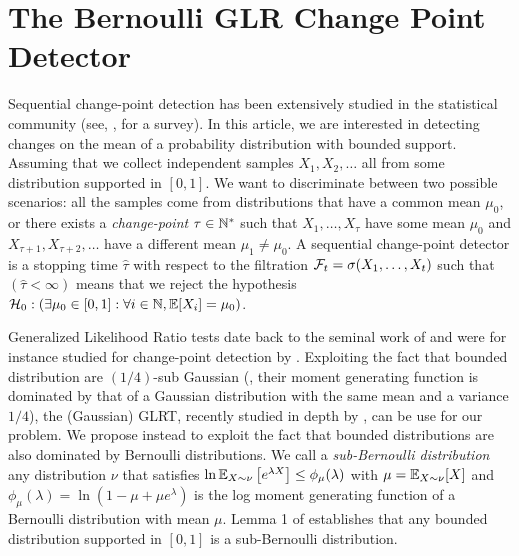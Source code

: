 

\section{The Bernoulli GLR Change Point Detector}
\label{sec:6:ChangePointDetector}

Sequential change-point detection has been extensively studied in the statistical community (see, \eg, \cite{Basseville93} for a survey). In this article, we are interested in detecting changes on the mean of a probability distribution with bounded support. Assuming that  we collect independent samples $X_1,X_2,\ldots$ all from some distribution supported in $[0,1]$. We want to discriminate between two possible scenarios: all the samples come from distributions that have a common mean $\mu_0$, or there exists a \emph{change-point} $\tau \in\mathbb{N}^*$ such that $X_1,\ldots,X_\tau$ have some mean $\mu_0$ and $X_{\tau +1},X_{\tau+2},\ldots$ have a different mean $\mu_1 \neq \mu_0$.
%
A sequential change-point detector is a stopping time $\hat\tau$ with respect to the filtration $\mathcal{F}_t = \sigma(X_1,\dots,X_t)$ such that $(\hat \tau < \infty)$ means that we reject the hypothesis
$\mathcal{H}_0 : \left(\exists \mu_0 \in [0,1]: \forall i\in\mathbb{N}, \mathbb{E}[X_i] = \mu_0\right)$.

Generalized Likelihood Ratio tests date back to the seminal work of \cite{barnard1959control} and were for instance studied for change-point detection by \cite{siegmund1995using}. Exploiting the fact that bounded distribution are $(1/4)$-sub Gaussian (\ie, their moment generating function is dominated by that of a Gaussian distribution with the same mean and a variance $1/4$), the (Gaussian) GLRT, recently studied in depth by \cite{Maillard2018GLR}, can be use for our problem. We propose instead to exploit the fact that bounded distributions are also dominated by Bernoulli distributions.
We call a \emph{sub-Bernoulli distribution} any distribution $\nu$ that satisfies
$\ln \mathbb{E}_{X\sim\nu}\left[e^{\lambda X}\right] \leq \phi_{\mu}(\lambda)$ with $\mu=\mathbb{E}_{X\sim \nu}[X]$ and $\phi_{\mu}(\lambda) = \ln(1-\mu + \mu e^\lambda)$ is the log moment generating function of a Bernoulli distribution with mean $\mu$. Lemma 1 of \cite{KLUCBJournal} establishes that any bounded distribution supported in $[0,1]$ is a sub-Bernoulli distribution.


